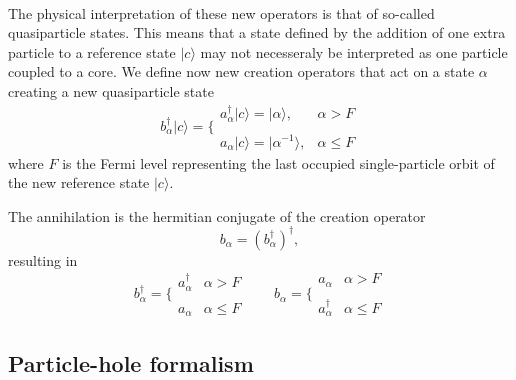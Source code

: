 \documentclass[%
twoside,                 %
final,                   %
10pt]{article}
\begin{document}
\paragraph{}
The physical interpretation of these new operators is that of so-called quasiparticle states.
This means that a state defined by the addition of one extra particle to a reference state $|c\rangle $ may not necesseraly be interpreted as one particle coupled to a core.
We define now new creation operators that act on a state $\alpha$ creating a new quasiparticle state
\begin{equation}
	b_\alpha^\dagger|c\rangle  = \Bigg\{ \begin{array}{ll}
		a_\alpha^\dagger |c\rangle  = |\alpha\rangle, & \alpha > F \\
		\\
		a_\alpha |c\rangle  = |\alpha^{-1}\rangle, & \alpha \leq F
	\end{array} \label{eq:2-52}
\end{equation}
where $F$ is the Fermi level representing the last  occupied single-particle orbit 
of the new reference state $|c\rangle $. 


The annihilation is the hermitian conjugate of the creation operator
\[
	b_\alpha = (b_\alpha^\dagger)^\dagger,
\]
resulting in
\begin{equation}
	b_\alpha^\dagger = \Bigg\{ \begin{array}{ll}
		a_\alpha^\dagger & \alpha > F \\
		\\
		a_\alpha & \alpha \leq F
	\end{array} \qquad 
	b_\alpha = \Bigg\{ \begin{array}{ll}
		a_\alpha & \alpha > F \\
		\\
		 a_\alpha^\dagger & \alpha \leq F
	\end{array} \label{eq:2-54}
\end{equation}



\subsection{Particle-hole formalism}

\end{document}
